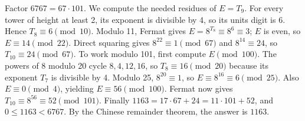 Factor $6767=67\cdot101$. We compute the needed residues of $E=T_9$. For every tower of height at least 2, its exponent is divisible by 4, so its units digit is 6. Hence $T_8\equiv6\pmod{10}$. Modulo 11, Fermat gives $E=8^{T_8}\equiv8^6\equiv3$; $E$ is even, so $E\equiv14\pmod{22}$. Direct squaring gives $8^{22}\equiv1\pmod{67}$ and $8^{14}\equiv24$, so $T_{10}\equiv24\pmod{67}$. To work modulo 101, first compute $E\pmod{100}$. The powers of 8 modulo 20 cycle $8,4,12,16$, so $T_8\equiv16\pmod{20}$ because its exponent $T_7$ is divisible by 4. Modulo 25, $8^{20}\equiv1$, so $E\equiv8^{16}\equiv6\pmod{25}$. Also $E\equiv0\pmod4$, yielding $E\equiv56\pmod{100}$. Fermat now gives $T_{10}\equiv8^{56}\equiv52\pmod{101}$. Finally $1163=17\cdot67+24=11\cdot101+52$, and $0\le1163<6767$. By the Chinese remainder theorem, the answer is $\boxed{1163}$.
